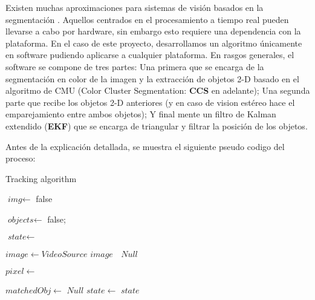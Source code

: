 Existen muchas aproximaciones para sistemas de visi\'on basados en la segmentaci\'on \cite{fast_segmentation_Mitra} \cite{fuzzy_segmentation}. Aquellos centrados en el procesamiento a tiempo real pueden llevarse a cabo por hardware, sin embargo esto requiere una dependencia con la plataforma. En el caso de este proyecto, desarrollamos un algoritmo \'unicamente en software pudiendo aplicarse a cualquier plataforma. En rasgos generales, el software se compone de tres partes: Una primera que se encarga de la segmentación en color de la imagen y la extracción de objetos 2-D basado en el algoritmo de CMU \cite{JamesBruce_CMU_SEG} (Color Cluster Segmentation: \textbf{CCS} en adelante); Una segunda parte que recibe los objetos 2-D anteriores (y en caso de vision est\'ereo hace el emparejamiento entre ambos objetos); Y final mente un filtro de Kalman extendido \cite{GabrielTerejanu_EKF} (\textbf{EKF}) que se encarga de triangular y filtrar la posición de los objetos. 




Antes de la explicaci\'on detallada, se muestra el siguiente pseudo codigo del proceso:

\begin{algorithm}[hp]
\caption{Tracking algorithm}\label{algorithm_pseudo}
	\begin{algorithmic}[1]
		\State {}
		\State {}
		\State $\textit{img}  \gets$ 
			\State \Return false
		\EndIf
		
		\State $\textit{objects} \gets$ 
			\State \Return false;
		\EndIf
		
		\State $\textit{state} \gets$ 
	\EndProcedure
	
			\State $image \gets VideoSource$
			\Return $image$
		\Else $\;$
			\State \Return $Null$
		\EndIf
		
	\EndProcedure
	
			\State {}
		\EndIf
			\State $pixel \gets$ 
		\EndFor
			\State \Return {}
	\EndProcedure
	
		\State $matchedObj \gets$  
			\State \Return $Null$
		\EndIf
		\State $state \gets$ 
		\State \Return $state$
	\EndProcedure
	
	\end{algorithmic}
\end{algorithm}